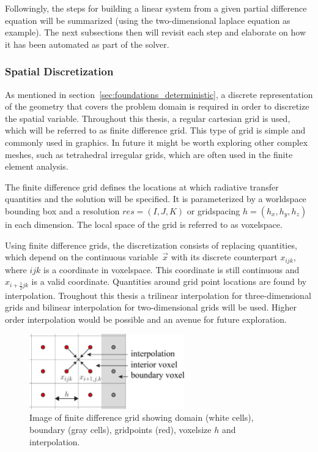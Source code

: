 Followingly, the steps for building a linear system from a given partial difference equation will be summarized (using the two-dimensional laplace equation as example). The next subsections then will revisit each step and elaborate on how it has been automated as part of the solver.

\subsubsection*{Spatial Discretization}

As mentioned in section~\ref{sec:foundations_deterministic}, a discrete representation of the geometry that covers the problem domain is required in order to discretize the spatial variable. Throughout this thesis, a regular cartesian grid is used, which will be referred to as finite difference grid. This type of grid is simple and commonly used in graphics. In future it might be worth exploring other complex meshes, such as tetrahedral irregular grids, which are often used in the finite element analysis. 

The finite difference grid defines the locations at which radiative transfer quantities and the solution will be specified. It is parameterized by a worldspace bounding box and a resolution $res=(I,J,K)$ or gridspacing $h=(h_x, h_y, h_z)$ in each dimension. The local space of the grid is referred to as voxelspace.

Using finite difference grids, the discretization consists of replacing quantities, which depend on the continuous variable~$\vec{x}$ with its discrete counterpart $x_{ijk}$, where $ijk$ is a coordinate in voxelspace. This coordinate is still continuous and $x_{i+\frac{1}{2}jk}$ is a valid coordinate. Quantities around grid point locations are found by interpolation. Troughout this thesis a trilinear interpolation for three-dimensional grids and bilinear interpolation for two-dimensional grids will be used. Higher order interpolation would be possible and an avenue for future exploration.
\begin{figure}[h]
\centering
\includegraphics[width=0.6\textwidth]{04_pn_method/figures/fig_fd_grids.pdf}
\caption{Image of finite difference grid showing domain (white cells), boundary (gray cells), gridpoints (red), voxelsize $h$ and interpolation.}
\label{fig:pn_solver_finite_difference_grid}
\end{figure}


